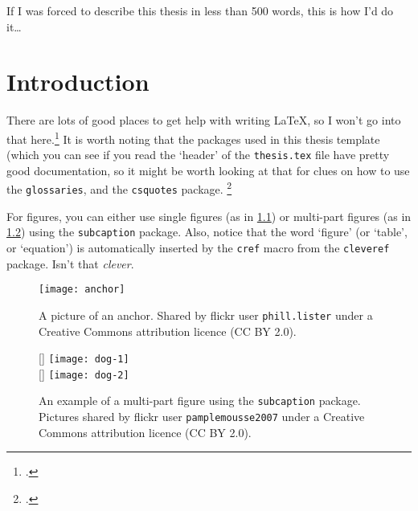\documentclass[12pt,xetex]{scrbook}
\begin{document}
\begin{onehalfspace}


If I was forced to describe this thesis in less than 500 words, this
is how I'd do it\ldots


\cleardoublepage
{}
\tableofcontents
\listoffigures
\listoftables


\printglossary[type=\acronymtype,title=Abbreviations]


\mainmatter

\pagestyle{headings}

\chapter{Introduction}
\label{chap:intro}

There are lots of good places to get help with writing LaTeX, so I
won't go into that here.\footcite[p.~433]{example1970}  
It is worth noting that the packages used in
this thesis template (which you can see if you read the `header' of
the \texttt{thesis.tex} file have pretty good documentation, so it
might be worth looking at that for clues on how to use the 
\texttt{glossaries}, and the \texttt{csquotes} package.
\footcite[p.~434]{example1970}

For figures, you can either use single figures (as in
\cref{fig:anchor}) or multi-part figures (as in \cref{fig:dog-figure})
using the \texttt{subcaption} package. Also, notice that the word
`figure' (or `table', or `equation') is automatically inserted by the
\texttt{cref} macro from the \texttt{cleveref} package. Isn't that
\emph{clever}.

\begin{figure}
  \centering
  \texttt{[image: anchor]}
  \caption{A picture of an anchor.  Shared by flickr user
    \texttt{phill.lister} under a Creative Commons attribution licence
     (CC BY 2.0).}
  \label{fig:anchor}
\end{figure}

\begin{figure}
  \centering
  [\textwidth]%
  {\texttt{[image: dog-1]}}\\
  \vspace{1cm}
  [\textwidth]%
  {\texttt{[image: dog-2]}}%
  \caption{An example of a multi-part figure using the
    \texttt{subcaption} package. Pictures shared by flickr user
    \texttt{pamplemousse2007} under a Creative Commons attribution
    licence (CC BY 2.0).}
  \label{fig:dog-figure}
\end{figure}



\end{onehalfspace}
\end{document}
